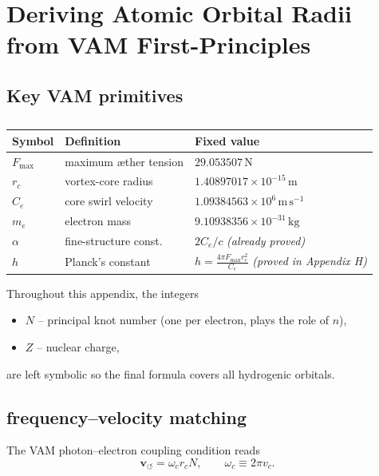 

\section{Deriving Atomic Orbital Radii from VAM First-Principles}

\subsection{Key VAM primitives}

\begin{table}[h]
    \centering
    \begin{tabular}{lll}
        \toprule
        \textbf{Symbol} & \textbf{Definition} & \textbf{Fixed value} \\
        \midrule
        $F_{\max}$ & maximum æther tension & $29.053507\,\text{N}$ \\
        $r_c$ & vortex-core radius & $1.40897017\times10^{-15}\,\text{m}$ \\
        $C_e$ & core swirl velocity & $1.09384563\times10^{6}\,\text{m}\,\text{s}^{-1}$ \\
        $m_e$ & electron mass & $9.10938356\times10^{-31}\,\text{kg}$ \\
        $\alpha$ & fine-structure const. & $2C_e/c$ \textit{(already proved)} \\
        $h$ & Planck’s constant & $\displaystyle h=\frac{4\pi F_{\max}r_c^{2}}{C_e}$ \textit{(proved in Appendix H)} \\
        \bottomrule
    \end{tabular}
    \caption{}
    \label{tab:primitives}
\end{table}

Throughout this appendix, the integers
\begin{itemize}
    \item $N$ -- principal knot number (one per electron, plays the role of $n$),
    \item $Z$ -- nuclear charge,
\end{itemize}
are left symbolic so the final formula covers all hydrogenic orbitals.

\subsection{frequency--velocity matching}

The VAM photon--electron coupling condition reads
\begin{equation}
    \mathbf{v}_{\scriptscriptstyle\boldsymbol{\circlearrowleft}} = \omega_c r_c N, \qquad \omega_c \equiv 2\pi v_c.
\label{eq:match1}
\end{equation}

